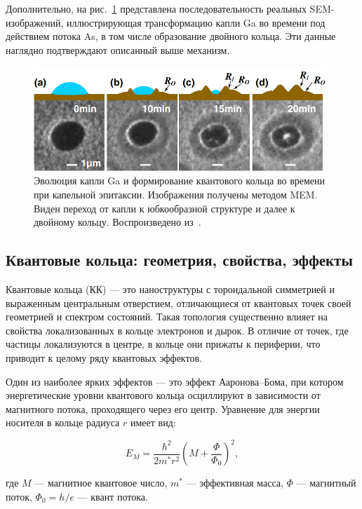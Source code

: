 \documentclass[14pt,oneside]{extarticle}
\begin{document}
Дополнительно, на рис.~\ref{fig:zhou1} представлена последовательность реальных SEM-изображений, иллюстрирующая трансформацию капли Ga во времени под действием потока As, в том числе образование двойного кольца. Эти данные наглядно подтверждают описанный выше механизм.

\begin{figure}[H]
    \begin{center}
        \includegraphics[width=11cm]{images/Zhou1-Firgure1.png}
        \caption{\label{fig:zhou1}
            Эволюция капли Ga и формирование квантового кольца во времени при капельной эпитаксии. Изображения получены методом MEM. Виден переход от капли к юбкообразной структуре и далее к двойному кольцу. Воспроизведено из~\cite{zhou2013}.}
    \end{center}
\end{figure}

\subsection{Квантовые кольца: геометрия, свойства, эффекты}

Квантовые кольца (КК) — это наноструктуры с тороидальной симметрией и выраженным центральным отверстием, отличающиеся от квантовых точек своей геометрией и спектром состояний. Такая топология существенно влияет на свойства локализованных в кольце электронов и дырок. В отличие от точек, где частицы локализуются в центре, в кольце они прижаты к периферии, что приводит к целому ряду квантовых эффектов.

Один из наиболее ярких эффектов — это эффект Ааронова–Бома, при котором энергетические уровни квантового кольца осциллируют в зависимости от магнитного потока, проходящего через его центр. Уравнение для энергии носителя в кольце радиуса $r$ имеет вид:

\[
E_M = \frac{\hbar^2}{2m^* r^2} \left( M + \frac{\Phi}{\Phi_0} \right)^2,
\]

где $M$ — магнитное квантовое число, $m^*$ — эффективная масса, $\Phi$ — магнитный поток, $\Phi_0 = h/e$ — квант потока.
\end{document}
